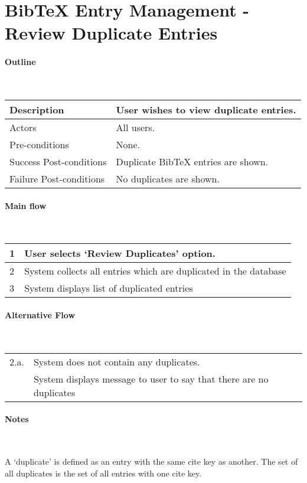 \section*{BibTeX Entry Management - Review Duplicate Entries} %

\paragraph*{Outline} \

\begin{tabular}{ | l | l | }
\hline
Description & User wishes to view duplicate entries. \\ \hline
Actors & All users. \\ \hline
Pre-conditions & None. \\ \hline
Success Post-conditions & Duplicate BibTeX entries are shown. \\ \hline
Failure Post-conditions & No duplicates are shown. \\ \hline
\end{tabular}


\paragraph*{Main flow} \

\begin{tabular}{ | l | l | } \hline
1 & User selects `Review Duplicates' option. \\ \hline
2 & System collects all entries which are duplicated in the database \\ \hline
3 & System displays list of duplicated entries \\ \hline
\end{tabular}


\paragraph*{Alternative Flow} \

\begin{tabular}{ | l | l | } \hline
2.a. & System does not contain any duplicates. \\
     & System displays message to user to say that there are no duplicates \\ \hline
\end{tabular}

\paragraph*{Notes} \

A `duplicate' is defined as an entry with the same cite key as another. The set of all duplicates is the set of all entries with one cite key.

